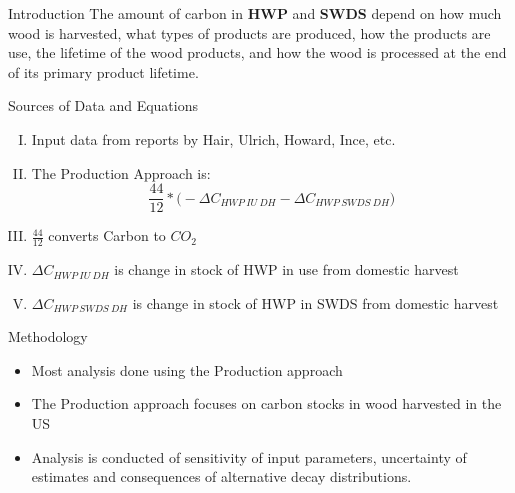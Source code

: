 \documentclass[final]{beamer}\usepackage[]{graphicx}\usepackage[]{color}
\newlength{\onecolwid}
\begin{document}
\begin{frame}[t]
\begin{columns}[t]
\begin{column}{\onecolwid}
\begin{block}{Introduction}
The amount of carbon in \textbf{HWP} and \textbf{SWDS} depend on how much wood is harvested, what types of products are produced, how the products are use, the lifetime of the wood products, and how the wood is processed at the end of its primary product lifetime.



\end{block}


\begin{block}{Sources of Data and Equations}

\begin{enumerate}[I.]
\item Input data from reports by Hair, Ulrich, Howard, Ince, etc. 
\vspace{.3ex}
\item The Production Approach is:  
\begin{equation}
\frac{44}{12} * \Big(-\Delta C_{HWP\:IU\:DH} - \Delta C_{HWP\:SWDS\:DH}\Big)
\label{eqn:Einstein}
\end{equation}
\vspace{.3ex}
\item $\frac{44}{12}$ converts Carbon to $CO_2$
\vspace{.3ex}
\item $\Delta C_{HWP\:IU\:DH}$ is change in stock of HWP in use from 
domestic harvest 
\vspace{.3ex}
\item $\Delta C_{HWP\:SWDS\:DH}$ is change in stock of HWP in SWDS
from domestic harvest 
\end{enumerate}
\vspace{.3ex}
\end{block}
\vfill

\begin{block}{Methodology}
\begin{itemize}
\item Most analysis done using the Production approach
\item The Production approach focuses on carbon stocks in wood harvested in the US
\item Analysis is conducted of sensitivity of input parameters, uncertainty of estimates
and consequences of alternative decay distributions. 
\end{itemize}
\end{block}


\end{column}
\end{columns}
\end{frame}
\end{document}
